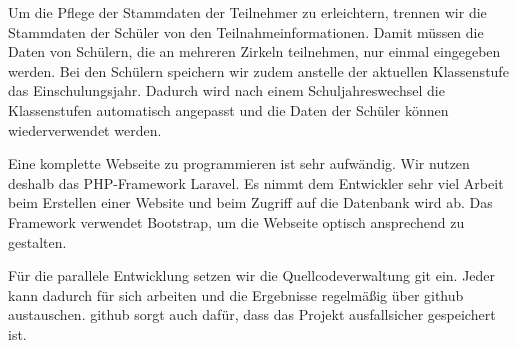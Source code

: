 Um die Pflege der Stammdaten der Teilnehmer zu erleichtern, trennen wir die Stammdaten der Schüler von den Teilnahmeinformationen. Damit müssen die Daten von Schülern, die an mehreren Zirkeln teilnehmen, nur einmal eingegeben werden. Bei den Schülern speichern wir zudem anstelle der aktuellen Klassenstufe das Einschulungsjahr. Dadurch wird nach einem Schuljahreswechsel die Klassenstufen automatisch angepasst und die Daten der Schüler können wiederverwendet werden.

Eine komplette Webseite zu programmieren ist sehr aufwändig. Wir nutzen deshalb das PHP-Framework Laravel. Es nimmt dem Entwickler sehr viel Arbeit beim Erstellen einer Website und beim Zugriff auf die Datenbank wird ab. Das Framework verwendet Bootstrap, um die Webseite optisch ansprechend zu gestalten. 

Für die parallele Entwicklung setzen wir die Quellcodeverwaltung git ein. Jeder kann dadurch für sich arbeiten und die Ergebnisse regelmäßig über github austauschen. github sorgt auch dafür, dass das Projekt ausfallsicher gespeichert ist.